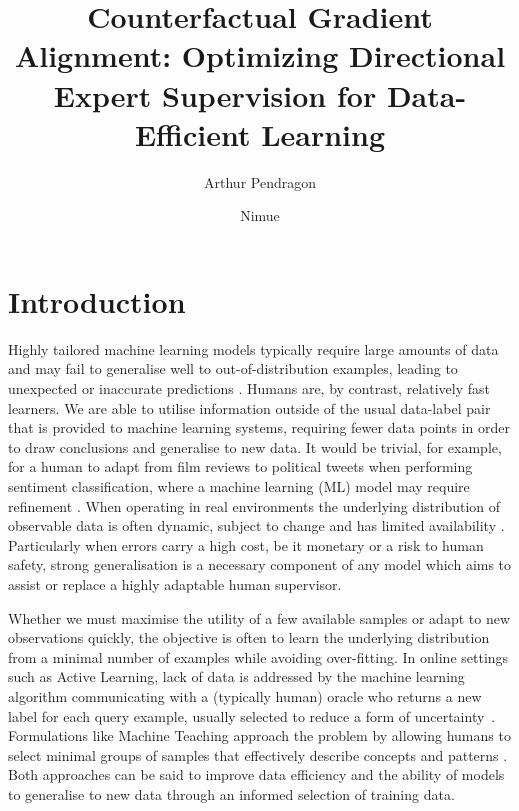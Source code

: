 \documentclass[sigconf,anonymous]{aamas}
\title[Counterfactual Gradient Alignment]{Counterfactual Gradient Alignment: Optimizing Directional Expert Supervision for Data-Efficient Learning}
\author{Arthur Pendragon}
\affiliation{
  \institution{Camelot Castle}
  \city{Camelot}
  \country{United Kingdom}}
\author{Nimue}
\affiliation{
  \institution{The Lady's Lake}
  \city{Avalon}
  \country{United Kingdom}}
\begin{document}

\pagestyle{fancy}
\fancyhead{}


\maketitle 


\section{Introduction}
Highly tailored machine learning models typically require large amounts of data and may fail to generalise well to out-of-distribution examples, leading to unexpected or inaccurate predictions \cite{hand_classifier, Challen231, souza2020challenges}. Humans are, by contrast, relatively fast learners. We are able to utilise information outside of the usual data-label pair that is provided to machine learning systems, requiring fewer data points in order to draw conclusions and generalise to new data. It would be trivial, for example, for a human to adapt from film reviews to political tweets when performing sentiment classification, where a machine learning (ML) model may require refinement \cite{blitzer-etal-2007-biographies}. When operating in real environments the underlying distribution of observable data is often dynamic, subject to change and has limited availability \cite{Sahiner2023}. Particularly when errors carry a high cost, be it monetary or a risk to human safety, strong generalisation is a necessary component of any model which aims to assist or replace a highly adaptable human supervisor.

Whether we must maximise the utility of a few available samples or adapt to new observations quickly, the objective is often to learn the underlying distribution from a minimal number of examples while avoiding over-fitting. In online settings such as Active Learning, lack of data is addressed by the machine learning algorithm communicating with a (typically human) oracle who returns a new label for each query example, usually selected to reduce a form of uncertainty~\cite{prince2004does}. Formulations like Machine Teaching approach the problem by allowing humans to select minimal groups of samples that effectively describe concepts and patterns \cite{Zhu2015}. Both approaches can be said to improve data efficiency and the ability of models to generalise to new data through an informed selection of training data.
\end{document}

